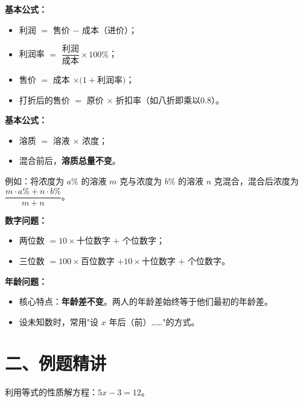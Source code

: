\documentclass[12pt, a4paper]{ctexart}
\begin{document}
\begin{knowledgebox}[利润问题]
\textbf{基本公式：}
\begin{itemize}[nosep]
  \item 利润 $=$ 售价 $-$ 成本（进价）；
  \item 利润率 $=$ $\dfrac{\text{利润}}{\text{成本}}\times 100\%$；
  \item 售价 $=$ 成本 $\times(1+$利润率$)$；
  \item 打折后的售价 $=$ 原价 $\times$ 折扣率（如八折即乘以0.8）。
\end{itemize}
\end{knowledgebox}

\begin{knowledgebox}[浓度问题]
\textbf{基本公式：}
\begin{itemize}[nosep]
  \item 溶质 $=$ 溶液 $\times$ 浓度；
  \item 混合前后，\textbf{溶质总量不变}。
\end{itemize}
例如：将浓度为 $a\%$ 的溶液 $m$ 克与浓度为 $b\%$ 的溶液 $n$ 克混合，混合后浓度为 $\dfrac{m \cdot a\% + n \cdot b\%}{m+n}$。
\end{knowledgebox}

\begin{knowledgebox}[数字问题与年龄问题]
\textbf{数字问题：}
\begin{itemize}[nosep]
  \item 两位数 $= 10\times$十位数字 $+$ 个位数字；
  \item 三位数 $= 100\times$百位数字 $+ 10\times$十位数字 $+$ 个位数字。
\end{itemize}

\textbf{年龄问题：}
\begin{itemize}[nosep]
  \item 核心特点：\textbf{年龄差不变}。两人的年龄差始终等于他们最初的年龄差。
  \item 设未知数时，常用"设 $x$ 年后（前）……"的方式。
\end{itemize}
\end{knowledgebox}

\section*{\textcolor{examorange}{二、例题精讲}}

\begin{examplebox}
利用等式的性质解方程：$5x-3=12$。
\end{examplebox}
\end{document}
